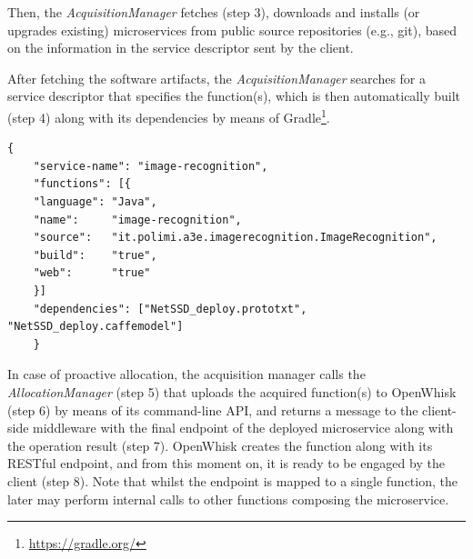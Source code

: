 Then, the \textit{AcquisitionManager} fetches (step 3), downloads and installs (or upgrades existing) microservices from public source repositories (e.g., git), based on the information in the service descriptor sent by the client. 

After fetching the software artifacts, the \textit{AcquisitionManager} searches for a service descriptor that specifies the function(s), which is then automatically built (step 4) along with its dependencies by means of Gradle\footnote{\url{https://gradle.org/}}.



\begin{minipage}{.9\linewidth}
	\begin{lstlisting}[caption=Image recognition service descriptor, label=lst:service-descriptor, captionpos=t]
	{
	"service-name":	"image-recognition",
	"functions": [{	
	"language":	"Java",
	"name":		"image-recognition",
	"source":	"it.polimi.a3e.imagerecognition.ImageRecognition",
	"build":	"true",
	"web":		"true"
	}]
	"dependencies": ["NetSSD_deploy.prototxt", "NetSSD_deploy.caffemodel"]
	}
	\end{lstlisting}
\end{minipage}



In case of proactive allocation, the acquisition manager calls the \textit{AllocationManager} (step 5) that uploads the acquired function(s) to OpenWhisk (step 6) by means of its command-line API, and returns a message to the client-side middleware with the final endpoint of the deployed microservice along with the operation result (step 7). OpenWhisk creates the function along with its RESTful endpoint, and from this moment on, it is ready to be engaged by the client (step 8). Note that whilst the endpoint is mapped to a single function, the later may perform internal calls to other functions composing the microservice. 




